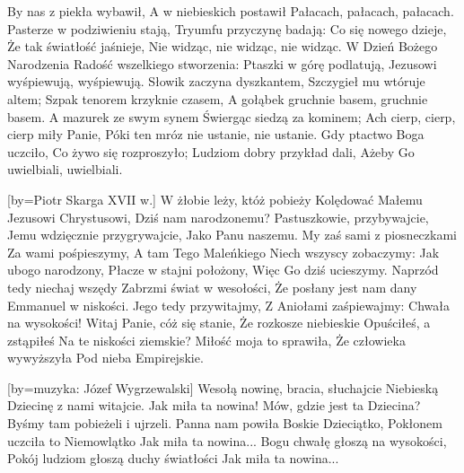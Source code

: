     By nas z piekła wybawił,
    A w niebieskich postawił
    Pałacach, pałacach, pałacach.
\endchorus
\beginverse
    Pasterze w podziwieniu stają,
    Tryumfu przyczynę badają:
\endverse
\beginchorus
    Co się nowego dzieje,
    Że tak światłość jaśnieje,
    Nie widząc, nie widząc, nie widząc.
\endchorus
\endsong
\beginverse
    W Dzień Bożego Narodzenia
    Radość wszelkiego stworzenia:
    Ptaszki w górę podlatują,
    Jezusowi wyśpiewują, wyśpiewują.
\endverse
\beginverse
    Słowik zaczyna dyszkantem,
    Szczygieł mu wtóruje altem;
    Szpak tenorem krzyknie czasem,
    A gołąbek gruchnie basem, gruchnie basem.
\endverse
\beginverse
    A mazurek ze swym synem
    Świergąc siedzą za kominem;
    Ach cierp, cierp, cierp miły Panie,
    Póki ten mróz nie ustanie, nie ustanie.
\endverse
\beginverse
    Gdy ptactwo Boga uczciło,
    Co żywo się rozproszyło;
    Ludziom dobry przykład dali,
    Ażeby Go uwielbiali, uwielbiali.
\endverse
\endsong

[by={Piotr Skarga XVII w.}]
\beginverse
    W żłobie leży, któż pobieży
    Kolędować Małemu
    Jezusowi Chrystusowi,
    Dziś nam narodzonemu?
\endverse
\beginchorus
        Pastuszkowie, przybywajcie,
        Jemu wdzięcznie przygrywajcie,
        Jako Panu naszemu.
\endchorus
\beginverse
    My zaś sami z piosneczkami
    Za wami pośpieszymy,
    A tam Tego Maleńkiego
    Niech wszyscy zobaczymy:
\endverse
\beginchorus
        Jak ubogo narodzony,
        Płacze w stajni położony,
        Więc Go dziś ucieszymy.
\endchorus
\beginverse
    Naprzód tedy niechaj wszędy
    Zabrzmi świat w wesołości,
    Że posłany jest nam dany
    Emmanuel w niskości.
\endverse
\beginchorus
        Jego tedy przywitajmy,
        Z Aniołami zaśpiewajmy:
        Chwała na wysokości!
\endchorus
\beginverse
    Witaj Panie, cóż się stanie,
    Że rozkosze niebieskie
    Opuściłeś, a zstąpiłeś
    Na te niskości ziemskie?
\endverse
\beginchorus
        Miłość moja to sprawiła,
        Że człowieka wywyższyła
        Pod nieba Empirejskie.
\endchorus
\endsong

 [by={muzyka: Józef Wygrzewalski}]
\beginverse
    Wesołą nowinę, bracia, słuchajcie
    Niebieską Dziecinę z nami witajcie.
\endverse
\beginchorus
        Jak miła ta nowina!
        Mów, gdzie jest ta Dziecina?
        Byśmy tam pobieżeli i ujrzeli.
\endchorus
\beginverse
    Panna nam powiła Boskie Dzieciątko,
    Pokłonem uczciła to Niemowlątko
\endverse
\beginchorus
        Jak miła ta nowina...
\endchorus
\beginverse
    Bogu chwałę głoszą na wysokości,
    Pokój ludziom głoszą duchy światłości
\endverse
\beginchorus
        Jak miła ta nowina...
\endchorus

